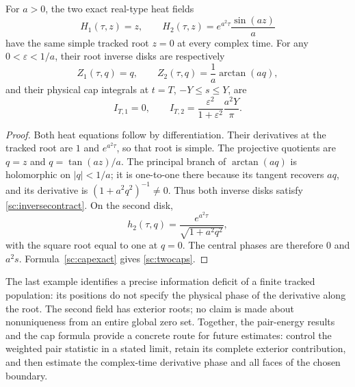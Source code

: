 \begin{proposition}
\label{sc:phasecontrol}
For $a>0$, the two exact real-type heat fields
\begin{equation}
 H_1(\tau,z)=z,\qquad
 H_2(\tau,z)=e^{a^2\tau}\frac{\sin(az)}a
 \label{sc:twoheatfields}
\end{equation}
have the same simple tracked root $z=0$ at every complex time. For any
$0<\varepsilon<1/a$, their root inverse disks are respectively
\begin{equation}
 Z_1(\tau,q)=q,\qquad
 Z_2(\tau,q)=\frac1a\arctan(aq),
 \label{sc:twoinverses}
\end{equation}
and their physical cap integrals at $t=T$, $-Y\le s\le Y$, are
\begin{equation}
 I_{T,1}=0,\qquad
 I_{T,2}=\frac{\varepsilon^2}{1+\varepsilon^2}
             \frac{a^2Y}{\pi}.
 \label{sc:twocaps}
\end{equation}
\end{proposition}

\begin{proof}
Both heat equations follow by differentiation. Their derivatives at the
tracked root are $1$ and $e^{a^2\tau}$, so that root is simple.
The projective quotients are $q=z$ and $q=\tan(az)/a$.
The principal branch of $\arctan(aq)$ is holomorphic on $|q|<1/a$;
it is one-to-one there because its tangent recovers $aq$, and its
derivative is $(1+a^2q^2)^{-1}\ne0$. Thus both inverse disks satisfy
\eqref{sc:inversecontract}. On the second disk,
\[
 h_2(\tau,q)=\frac{e^{a^2\tau}}{\sqrt{1+a^2q^2}},
\]
with the square root equal to one at $q=0$. The central phases are
therefore $0$ and $a^2s$. Formula~\eqref{sc:capexact} gives
\eqref{sc:twocaps}.
\end{proof}

The last example identifies a precise information deficit of a finite
tracked population: its positions do not specify the physical phase
of the derivative along the root. The second field has exterior roots;
no claim is made about nonuniqueness from an entire global zero set.
Together, the pair-energy results and the cap formula provide a concrete
route for future estimates: control the weighted pair statistic in a
stated limit, retain its complete exterior contribution, and then
estimate the complex-time derivative phase and all faces of the chosen
boundary.
